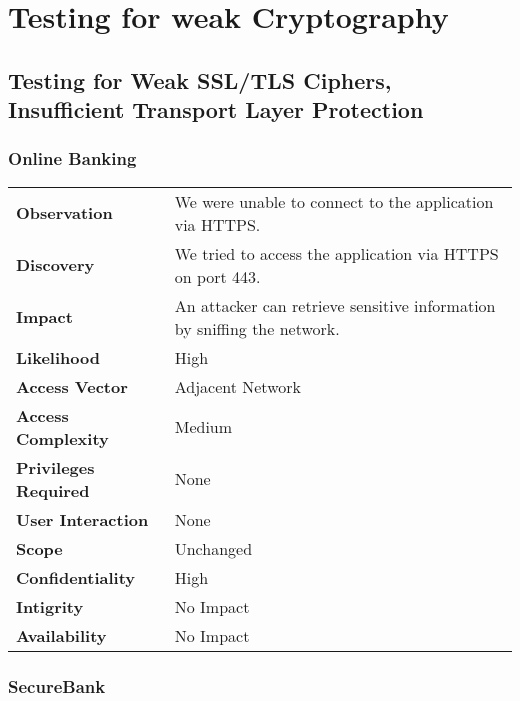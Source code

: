 \clearpage

\section{Testing for weak Cryptography}
\subsection{Testing for Weak SSL/TLS Ciphers, Insufficient Transport Layer Protection}
\label{subsec:encryption}

\subsubsection*{Online Banking}

\begin{tabular}{l|p{10cm}}

\textbf{Observation} & We were unable to connect to the application via HTTPS.  \\
\textbf{Discovery} & We tried to access the application via HTTPS on port 443. \\
\textbf{Impact} & An attacker can retrieve sensitive information by sniffing the network. \\
\textbf{Likelihood} & High \\
\textbf{Access Vector} & Adjacent Network \\
\textbf{Access Complexity} & Medium \\
\textbf{Privileges Required} & None \\
\textbf{User Interaction} & None \\
\textbf{Scope} & Unchanged \\
\textbf{Confidentiality} & High \\
\textbf{Intigrity} & No Impact \\
\textbf{Availability} & No Impact \\
\end{tabular}

\subsubsection*{SecureBank}


